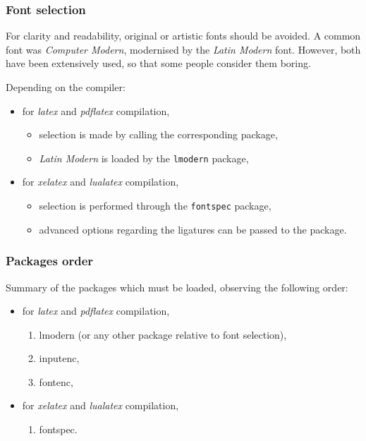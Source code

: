 \documentclass[11pt]{beamer}
\begin{document}
\begin{frame}
	\frametitle{Font selection}
	
	For clarity and readability, original or artistic fonts should be avoided.
	A common font was \textit{Computer Modern}, modernised by the \textit{Latin Modern} font. However, both have been extensively used, so that some people consider them boring.
	
	Depending on the compiler:
	\begin{itemize}
		\item for \textit{latex} and \textit{pdflatex} compilation,
		\begin{itemize}
			\item selection is made by calling the corresponding package,
			\item \textit{Latin Modern} is loaded by the \texttt{lmodern} package,
		\end{itemize}
		\item for \textit{xelatex} and \textit{lualatex} compilation,
		\begin{itemize}
			\item selection is performed through the \texttt{fontspec} package,
			\item advanced options regarding the ligatures can be passed to the package.
		\end{itemize}
	\end{itemize}
\end{frame}


\begin{frame}
	\frametitle{Packages order}
	
	Summary of the packages which must be loaded, observing the following order:
	\begin{itemize}
		\item for \textit{latex} and \textit{pdflatex} compilation,
		\begin{enumerate}
			\item lmodern (or any other package relative to font selection),
			\item inputenc,
			\item fontenc,
		\end{enumerate}
		\item for \textit{xelatex} and \textit{lualatex} compilation,
		\begin{enumerate}
			\item fontspec.
		\end{enumerate}
	\end{itemize}
\end{frame}


  

\end{document}
